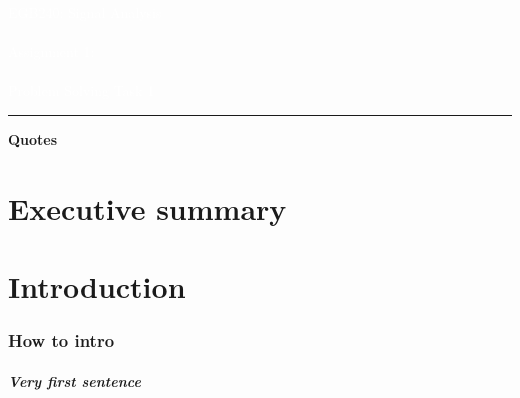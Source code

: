 \documentclass[english]{book}
\author{%
    \myname \\
    \mySTDNum \\
    \texttt{n11321393@qut.edu.au}\vspace{40pt}
    }
\makeatletter
\def\subjectCode{EGB240} %
\def\subjectName{Signal Analysis} %
\def\AssignmentNum{Assignment 1} %
\def\taskName{Problem Solving Task 1} %
\def\printauthor{%
    {\large \@author}}
\makeatother
\begin{document}
\pagestyle{fancy}
\begin{titlepage}
    \BgThispage
    \vspace*{2cm}
    \noindent
    \textcolor{white}{\bigsf  \subjectCode : \subjectName \\ \\ \mediumsf
    \AssignmentNum : \\ \\
     \taskName}
    \vspace*{2.5cm}\par
    \noindent
    \begin{minipage}{0.35\linewidth}
        \begin{flushright}
            \printauthor
        \end{flushright}
    \end{minipage} \hspace{15pt}
    \begin{minipage}{0.02\linewidth}
        \rule{1pt}{75pt}
    \end{minipage} \hspace{-5pt}
    \begin{minipage}{0.6\linewidth}
    \vspace{5pt}
        \textbf{Quotes}\\
        \lipsum[1]
    \end{minipage}
\end{titlepage}
\restoregeometry
\chapter{Executive summary}
\lipsum[2-5]
\frontmatter

\tableofcontents %

\listoffigures
\listoftables

\setcounter{chapter}{1}
\chapter{Introduction} %
\lipsum[1-3]
\cite*{foster_gibbs_1991} %
\subsection{How to intro}
\paragraph{Very first sentence }
\end{document}
